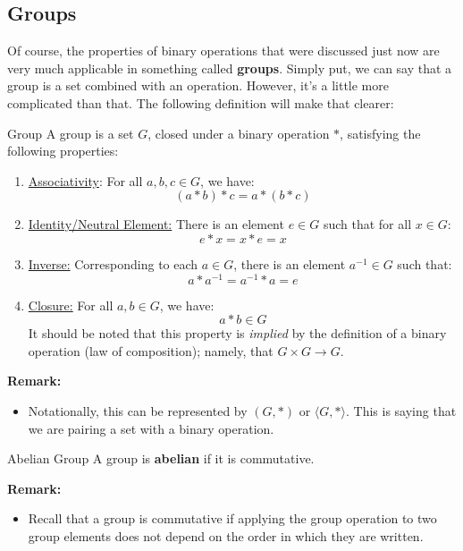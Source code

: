 \documentclass[letterpaper]{article}
\begin{document}
\subsection{Groups}
Of course, the properties of binary operations that were discussed just now are very much applicable in something called \textbf{groups}. Simply put, we can say that a group is a set combined with an operation. However, it's a little more complicated than that. The following definition will make that clearer:
\begin{definition}{Group}{}
    A group is a set $G$, closed under a binary operation $*$, satisfying the following properties:
    \begin{enumerate}
        \item \underline{Associativity}: For all $a, b, c \in G$, we have:
        \[(a * b) * c = a * (b * c)\]

        \item \underline{Identity/Neutral Element:} There is an element $e \in G$ such that for all $x \in G$:
        \[e * x = x * e = x\]

        \item \underline{Inverse:} Corresponding to each $a \in G$, there is an element $a^{-1} \in G$ such that:
        \[a * a^{-1} = a^{-1} * a = e\]

        \item \underline{Closure:} For all $a, b \in G$, we have:
        \[a * b \in G\]
        It should be noted that this property is \emph{implied} by the definition of a binary operation (law of composition); namely, that $G \times G \to G$.  
    \end{enumerate}
\end{definition}
\textbf{Remark:}
\begin{itemize}
    \item Notationally, this can be represented by $(G, *)$ or $\langle G, * \rangle$. This is saying that we are pairing a set with a binary operation. 
\end{itemize}

\begin{definition}{Abelian Group}{}
    A group is \textbf{abelian} if it is commutative.
\end{definition}
\textbf{Remark:}
\begin{itemize}
    \item Recall that a group is commutative if applying the group operation to two group elements does not depend on the order in which they are written. 
\end{itemize}
\end{document}
